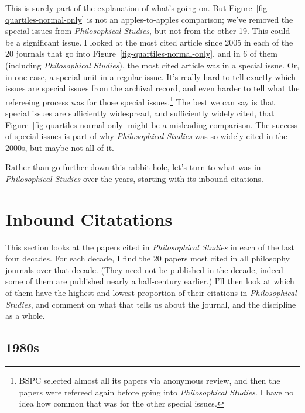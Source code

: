 \documentclass[
  10pt,
  letterpaper,
  DIV=11,
  numbers=noendperiod,
  twoside]{scrartcl}
\begin{document}
This is surely part of the explanation of what's going on. But
Figure~\ref{fig-quartiles-normal-only} is not an apples-to-apples
comparison; we've removed the special issues from \emph{Philosophical
Studies}, but not from the other 19. This could be a significant issue.
I looked at the most cited article since 2005 in each of the 20 journals
that go into Figure~\ref{fig-quartiles-normal-only}, and in 6 of them
(including \emph{Philosophical Studies}), the most cited article was in
a special issue. Or, in one case, a special unit in a regular issue.
It's really hard to tell exactly which issues are special issues from
the archival record, and even harder to tell what the refereeing process
was for those special issues.\footnote{BSPC selected almost all its
  papers via anonymous review, and then the papers were refereed again
  before going into \emph{Philosophical Studies}. I have no idea how
  common that was for the other special issues.} The best we can say is
that special issues are sufficiently widespread, and sufficiently widely
cited, that Figure~\ref{fig-quartiles-normal-only} might be a misleading
comparison. The success of special issues is part of why
\emph{Philosophical Studies} was so widely cited in the 2000s, but maybe
not all of it.

Rather than go further down this rabbit hole, let's turn to what was in
\emph{Philosophical Studies} over the years, starting with its inbound
citations.

\section{Inbound Citatations}\label{sec-inbound-citations}

This section looks at the papers cited in \emph{Philosophical Studies}
in each of the last four decades. For each decade, I find the 20 papers
most cited in all philosophy journals over that decade. (They need not
be published in the decade, indeed some of them are published nearly a
half-century earlier.) I'll then look at which of them have the highest
and lowest proportion of their citations in \emph{Philosophical
Studies}, and comment on what that tells us about the journal, and the
discipline as a whole.

\subsection{1980s}\label{s}
\end{document}
